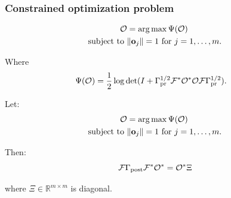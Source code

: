\documentclass{beamer}
\begin{document}
\begin{frame}
\frametitle{Constrained optimization problem}
\begin{align*}
  \begin{split}
  \mathcal{O} &= \operatorname*{arg\,max}\Psi(\mathcal{O})\\
  \text{subject to }& \|\mathbf{o}_j\| = 1 \text{ for } j=1,\dots,m.
  \end{split}
\end{align*}

Where
\begin{align*}
  \begin{split}
    \tar(\obs) %
    &= \frac12 \log \det ( I + \prcov^{1/2} \fwd ^* \obs^* \obs \fwd
    \prcov^{1/2}).
  \end{split}
\end{align*}
\end{frame}

\begin{frame}

  Let:
  \begin{align*}
    \begin{split}
      \mathcal{O} &= \operatorname*{arg\,max}\Psi(\mathcal{O})\\
      \text{subject to }& \|\mathbf{o}_j\| = 1 \text{ for } j=1,\dots,m.
    \end{split}
  \end{align*}
  
  Then:
  \[
   \mathcal{F} \Gamma_{\textup{post}} \mathcal{F}^* \mathcal{O}^* = \mathcal{O}^* \Xi
  \]

  where \(\Xi \in \mathbb{R}^{m \times m}\) is diagonal.

\end{frame}
\end{document}
